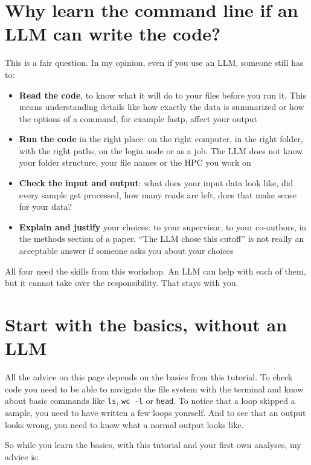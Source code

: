 \documentclass[
  letterpaper,
  DIV=11,
  numbers=noendperiod]{scrreprt}
\providecommand{\tightlist}{%
  \setlength{\itemsep}{0pt}\setlength{\parskip}{0pt}}
\begin{document}
\section{Why learn the command line if an LLM can write the
code?}\label{why-learn-the-command-line-if-an-llm-can-write-the-code}

This is a fair question. In my opinion, even if you use an LLM, someone
still has to:

\begin{itemize}
\tightlist
\item
  \textbf{Read the code}, to know what it will do to your files before
  you run it. This means understanding details like how exactly the data
  is summarized or how the options of a command, for example fastp,
  affect your output
\item
  \textbf{Run the code} in the right place: on the right computer, in
  the right folder, with the right paths, on the login node or as a job.
  The LLM does not know your folder structure, your file names or the
  HPC you work on
\item
  \textbf{Check the input and output}: what does your input data look
  like, did every sample get processed, how many reads are left, does
  that make sense for your data?
\item
  \textbf{Explain and justify} your choices: to your supervisor, to your
  co-authors, in the methods section of a paper. ``The LLM chose this
  cutoff'' is not really an acceptable answer if someone asks you about
  your choices
\end{itemize}

All four need the skills from this workshop. An LLM can help with each
of them, but it cannot take over the responsibility. That stays with
you.

\section{Start with the basics, without an
LLM}\label{start-with-the-basics-without-an-llm}

All the advice on this page depends on the basics from this tutorial. To
check code you need to be able to navigate the file system with the
terminal and know about basic commands like \texttt{ls}, \texttt{wc\ -l}
or \texttt{head}. To notice that a loop skipped a sample, you need to
have written a few loops yourself. And to see that an output looks
wrong, you need to know what a normal output looks like.

So while you learn the basics, with this tutorial and your first own
analyses, my advice is:
\end{document}
